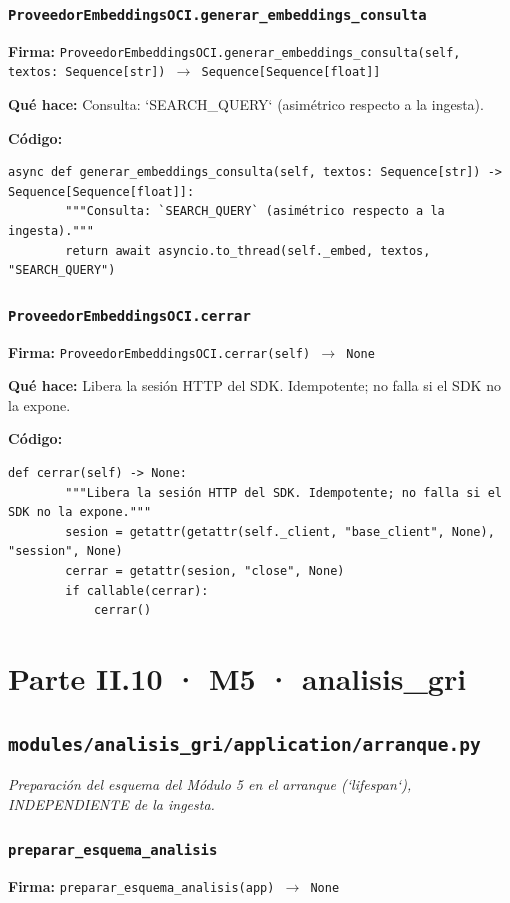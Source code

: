 \documentclass[11pt,a4paper]{article}
\begin{document}
\subsubsection*{\texttt{ProveedorEmbeddingsOCI.generar\_embeddings\_consulta}}
\textbf{Firma:} \texttt{ProveedorEmbeddingsOCI.generar\_embeddings\_consulta(self, textos: Sequence[str]) $\rightarrow$ Sequence[Sequence[float]]}

\textbf{Qué hace:} Consulta: `SEARCH\_QUERY` (asimétrico respecto a la ingesta).

\textbf{Código:}
\begin{lstlisting}
async def generar_embeddings_consulta(self, textos: Sequence[str]) -> Sequence[Sequence[float]]:
        """Consulta: `SEARCH_QUERY` (asimétrico respecto a la ingesta)."""
        return await asyncio.to_thread(self._embed, textos, "SEARCH_QUERY")
\end{lstlisting}

\subsubsection*{\texttt{ProveedorEmbeddingsOCI.cerrar}}
\textbf{Firma:} \texttt{ProveedorEmbeddingsOCI.cerrar(self) $\rightarrow$ None}

\textbf{Qué hace:} Libera la sesión HTTP del SDK. Idempotente; no falla si el SDK no la expone.

\textbf{Código:}
\begin{lstlisting}
def cerrar(self) -> None:
        """Libera la sesión HTTP del SDK. Idempotente; no falla si el SDK no la expone."""
        sesion = getattr(getattr(self._client, "base_client", None), "session", None)
        cerrar = getattr(sesion, "close", None)
        if callable(cerrar):
            cerrar()
\end{lstlisting}

\section{Parte II.10 · M5 · analisis\_gri}
\subsection{\texttt{modules/analisis\_gri/application/arranque.py}}
\textit{Preparación del esquema del Módulo 5 en el arranque (`lifespan`), INDEPENDIENTE de la ingesta.}

\subsubsection*{\texttt{preparar\_esquema\_analisis}}
\textbf{Firma:} \texttt{preparar\_esquema\_analisis(app) $\rightarrow$ None}
\end{document}

